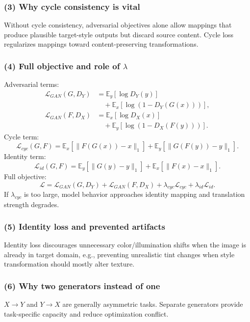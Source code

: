 \documentclass[conference]{IEEEtran}
\begin{document}
\subsubsection{(3) Why cycle consistency is vital}
Without cycle consistency, adversarial objectives alone allow mappings that produce plausible target-style outputs but discard source content. Cycle loss regularizes mappings toward content-preserving transformations.

\subsubsection{(4) Full objective and role of $\lambda$}
Adversarial terms:
\begin{align}
\mathcal{L}_{GAN}(G,D_Y)
&=\mathbb{E}_{y}[\log D_Y(y)] \nonumber\\
&\quad+\mathbb{E}_{x}[\log(1-D_Y(G(x)))],\\
\mathcal{L}_{GAN}(F,D_X)
&=\mathbb{E}_{x}[\log D_X(x)] \nonumber\\
&\quad+\mathbb{E}_{y}[\log(1-D_X(F(y)))].
\end{align}
Cycle term:
\begin{equation}
\mathcal{L}_{cyc}(G,F)
=\mathbb{E}_{x}[\|F(G(x))-x\|_1]
+\mathbb{E}_{y}[\|G(F(y))-y\|_1].
\end{equation}
Identity term:
\begin{equation}
\mathcal{L}_{id}(G,F)
=\mathbb{E}_{y}[\|G(y)-y\|_1]
+\mathbb{E}_{x}[\|F(x)-x\|_1].
\end{equation}
Full objective:
\begin{equation}
\mathcal{L}=\mathcal{L}_{GAN}(G,D_Y)
+\mathcal{L}_{GAN}(F,D_X)
+\lambda_{cyc}\mathcal{L}_{cyc}
+\lambda_{id}\mathcal{L}_{id}.
\end{equation}
If $\lambda_{cyc}$ is too large, model behavior approaches identity mapping and translation strength degrades.

\subsubsection{(5) Identity loss and prevented artifacts}
Identity loss discourages unnecessary color/illumination shifts when the image is already in target domain, e.g., preventing unrealistic tint changes when style transformation should mostly alter texture.

\subsubsection{(6) Why two generators instead of one}
$X\to Y$ and $Y\to X$ are generally asymmetric tasks. Separate generators provide task-specific capacity and reduce optimization conflict.
\end{document}
